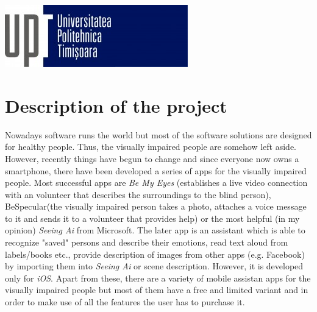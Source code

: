 \documentclass{article}[11]
\begin{document}
\begin{titlepage}




\vspace{3.5cm}

\includegraphics{./imgs/UptLogo.jpg}\\[1cm] %
 

\vfill %

\end{titlepage}

\tableofcontents
\newpage

\section{Description of the project}
	Nowadays software runs the world but most of the software solutions are designed for healthy people. Thus,  the visually impaired people are somehow left aside. However, recently things have begun to change and since everyone now owns a smartphone, there have been developed a series of apps for the visually impaired people. Most successful apps are \emph{Be My Eyes} (establishes a live video connection with an volunteer that describes the surroundings to the blind person), BeSpecular(the visually impaired person takes a photo, attaches a voice message to it and sends it to a volunteer that provides help) or the most helpful (in my opinion) \emph{Seeing Ai} from Microsoft. The later \ac{app} is an assistant which is able to recognize "saved" persons and describe their emotions, read text aloud from labels/books etc., provide description of images from other \ac{apps} (e.g. Facebook) by importing them into \emph{Seeing Ai} or scene description. However, it is developed only for \emph{iOS}. Apart from these, there are a variety of mobile assistan apps for the visually impaired people but most of them  have a free and limited variant and in order to make use of all the features the user has to purchase it. \\
	
\end{document}
